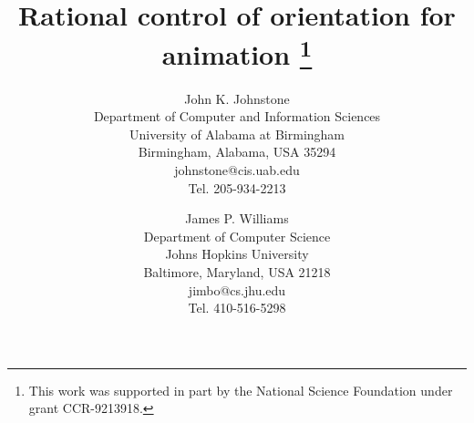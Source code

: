 \newtheorem{rmk}{Remark}[section]
\newtheorem{example}{Example}[section]
\newtheorem{conjecture}{Conjecture}[section]
\newtheorem{claim}{Claim}[section]
\newtheorem{notation}{Notation}[section]
\newtheorem{lemma}{Lemma}[section]
\newtheorem{theorem}{Theorem}[section]
\newtheorem{corollary}{Corollary}[section]
\newtheorem{defn2}{Definition}


\pagestyle{empty}	

\setlength{\oddsidemargin}{0pt}
\setlength{\topmargin}{-.25in}	%
\setlength{\headsep}{0pt}
\setlength{\textheight}{8.75in}
\setlength{\textwidth}{6.5in}
\setlength{\columnsep}{5mm}		%

\title{Rational control of orientation for animation
        \thanks{This work was supported in part by the National
	Science Foundation under grant CCR-9213918.}}
\author{John K. Johnstone\\
	Department of Computer and Information Sciences\\
	University of Alabama at Birmingham\\
	Birmingham, Alabama, USA 35294\\
	johnstone@cis.uab.edu\\
	Tel. 205-934-2213
	\and 
	James P. Williams\\
	Department of Computer Science\\
	Johns Hopkins University\\
	Baltimore, Maryland, USA 21218\\
	jimbo@cs.jhu.edu\\
	Tel. 410-516-5298}



\maketitle
\thispagestyle{empty}

